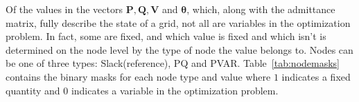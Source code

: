 \indent Of the values in the vectors $\boldsymbol{P}, \boldsymbol{Q}, \boldsymbol{V}$ and $\boldsymbol{\theta}$,
which, along with the admittance matrix, fully describe the state of a grid, not all are variables in the optimization problem.
In fact, some are fixed, and which value is fixed and which isn't is determined on the node level by the type of node the value belongs to.
Nodes can be one of three types: Slack(reference), PQ and PVAR.
Table~\ref{tab:nodemasks} contains the binary masks for each node type and value where $1$ indicates a fixed quantity and $0$
indicates a variable in the optimization problem.